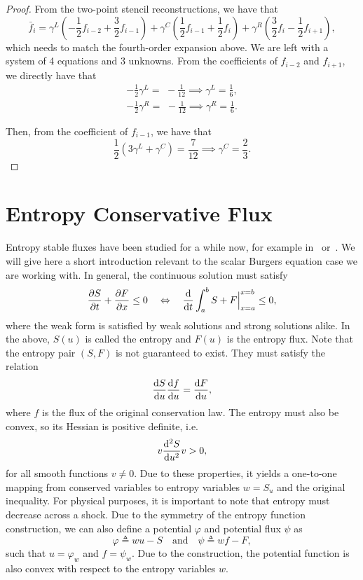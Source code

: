 \documentclass{scrartcl}
\begin{document}
\begin{proof}
From the two-point stencil reconstructions, we have that
\[
\bar{f}_i =
\gamma^L \left(-\frac{1}{2} f_{i - 2} + \frac{3}{2} f_{i - 1}\right)
+ \gamma^C \left(\frac{1}{2} f_{i - 1} + \frac{1}{2} f_i\right)
+ \gamma^R \left(\frac{3}{2} f_i - \frac{1}{2} f_{i + 1}\right),
\]
which needs to match the fourth-order expansion above. We are left with a system
of 4 equations and 3 unknowns. From the coefficients of $f_{i - 2}$ and $f_{i + 1}$,
we directly have that
\[
\begin{aligned}
-\frac{1}{2} \gamma^L =\,\, -\frac{1}{12} \implies \gamma^L = \frac{1}{6}, \\
-\frac{1}{2} \gamma^R =\,\, -\frac{1}{12} \implies \gamma^R = \frac{1}{6}.
\end{aligned}
\]

Then, from the coefficient of $f_{i - 1}$, we have that
\[
\frac{1}{2} (3 \gamma^L + \gamma^C) = \frac{7}{12} \implies
\gamma^C = \frac{2}{3}.
\]
\end{proof}


\section{Entropy Conservative Flux} %
\label{ax:entropy}

Entropy stable fluxes have been studied for a while now, for example
in~\cite{Tadmor2003} or~\cite{Ismail2009}. We will give here a short introduction
relevant to the scalar Burgers equation case we are working with. In general,
the continuous solution must satisfy
\[
\dfrac{\partial S}{\partial t} + \dfrac{\partial F}{\partial x} \le 0
\quad \Leftrightarrow \quad
\dfrac{\mathrm{d} }{\mathrm{d} t} \int_a^b S + F\Big|_{x = a}^{x = b} \le 0,
\]
where the weak form is satisfied by weak solutions and strong solutions alike.
In the above, $S(u)$ is called the entropy and $F(u)$ is the entropy flux. Note
that the entropy pair $(S, F)$ is not guaranteed to exist. They must satisfy the
relation
\[
\dfrac{\mathrm{d} S}{\mathrm{d} u} \dfrac{\mathrm{d} f}{\mathrm{d} u} = \dfrac{\mathrm{d} F}{\mathrm{d} u},
\]
where $f$ is the flux of the original conservation law. The entropy must also
be convex, so its Hessian is positive definite, i.e.
\[
v \dfrac{\mathrm{d} ^2S}{\mathrm{d} u^2} v > 0,
\]
for all smooth functions $v \ne 0$. Due to these properties, it yields a one-to-one
mapping from conserved variables to entropy variables $w = S_u$ and the original
inequality. For physical purposes, it is important to note that entropy must
decrease across a shock. Due to the symmetry of the entropy function construction,
we can also define a potential $\varphi$ and potential flux $\psi$ as
\[
\varphi \triangleq w u - S
\quad \text{and} \quad
\psi \triangleq w f - F,
\]
such that $u = \varphi_w$ and $f = \psi_w$. Due to the construction, the potential
function is also convex with respect to the entropy variables $w$.
\end{document}
